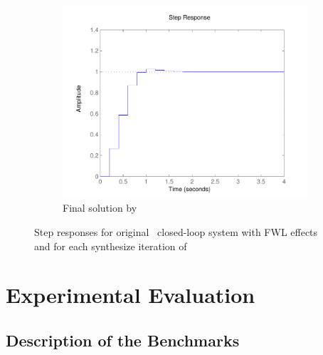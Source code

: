 \documentclass[final]{sig-alternate-05-2015}
\begin{document}
\begin{figure}
\begin{subfigure}[b]{0.3\textwidth}
        \includegraphics[width=\textwidth]{figures/runningexample_step2.pdf}
        \caption{Final solution by \tool}
        \label{fig:step2}
    \end{subfigure}
    \caption{Step responses for original~\cite{DBLP:conf/hybrid/WangGRJF16}
             closed-loop system with FWL effects and for each
             {\sc synthesize} iteration of \tool}\label{fig:step}
\end{figure}

\section{Experimental Evaluation}\label{sec:experiments}


\subsection{Description of the Benchmarks}
\label{experimental-setup}
\end{document}
